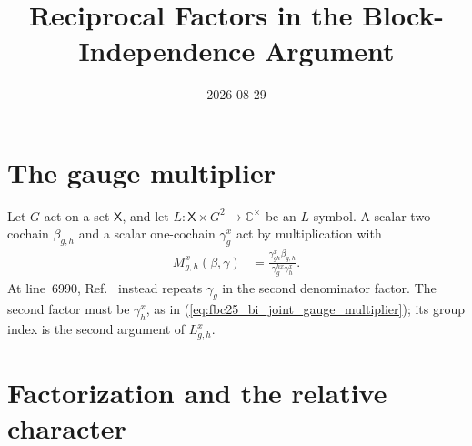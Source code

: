 \documentclass{article}
\title{Reciprocal Factors in the Block-Independence Argument}
\author{}
\date{2026-08-29}
\begin{document}
\maketitle
{}

\section{The gauge multiplier}

Let $G$ act on a set $\mathsf X$, and let
$L\colon\mathsf X\times G^2\to\mathbb C^\times$ be an $L$-symbol. A scalar
two-cochain $\beta_{g,h}$ and a scalar one-cochain $\gamma^x_g$ act by multiplication
with
\begin{align}
    M^x_{g,h}(\beta,\gamma)
        &=\frac{\gamma^x_{gh}\beta_{g,h}}
        {\gamma^{h x}_g\gamma^x_h}.
    \label{eq:fbc25_bi_joint_gauge_multiplier}
\end{align}
At line~6990, Ref.~\cite{FrancoRubio2025MPUGauging} instead repeats
$\gamma_g$ in the second denominator factor. The second factor must be
$\gamma_h^x$, as in
(\ref{eq:fbc25_bi_joint_gauge_multiplier}); its group index is the second
argument of $L^x_{g,h}$.

\section{Factorization and the relative character}
\end{document}
